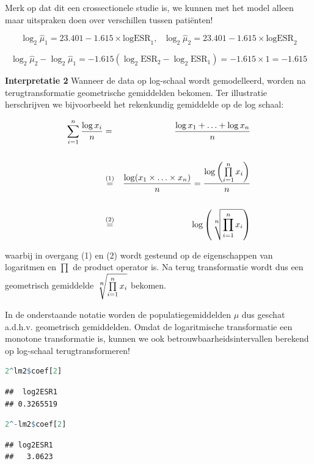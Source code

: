 \documentclass[
  12pt,dutch,coursenotes]{book}
\theoremstyle{definition}
\theoremstyle{definition}
\theoremstyle{definition}
\theoremstyle{definition}
\theoremstyle{remark}
\begin{document}
Merk op dat dit een crossectionele studie is, we kunnen met het model alleen maar uitspraken doen over verschillen tussen patiënten!

\[\log_2 \hat\mu_1=23.401  -1.615 \times \text{logESR}_1,\text{ } \log_2 \hat\mu_2=23.401  -1.615 \times \text{logESR}_2 \]

\[\log_2 \hat\mu_2-\log_2 \hat\mu_1=  -1.615 (\log_2 \text{ESR}_2-\log_2 \text{ESR}_1) = -1.615 \times 1 = -1.615\]

\textbf{Interpretatie 2}
Wanneer de data op log-schaal wordt gemodelleerd, worden na terugtransformatie geometrische gemiddelden bekomen.
Ter illustratie herschrijven we bijvoorbeeld het rekenkundig gemiddelde op de log schaal:

\begin{eqnarray*}
\sum\limits_{i=1}^n \frac{\log x_i}{n}&=&\frac{\log x_1 + \ldots + \log x_n}{n}\\\\
&\stackrel{(1)}{=}&\frac{\log(x_1 \times \ldots \times x_n)}{n}=\frac{\log\left(\prod\limits_{i=1}^n x_i\right)}{n}\\\\
&\stackrel{(2)}{=}&\log \left(\sqrt[\leftroot{-1}\uproot{2}\scriptstyle n]{\prod\limits_{i=1}^n x_i}\right)
\end{eqnarray*}

waarbij in overgang (1) en (2) wordt gesteund op de eigenschappen van logaritmen en \(\prod\) de product operator is.
Na terug transformatie wordt dus een geometrisch gemiddelde \(\sqrt[\leftroot{-1}\uproot{2}\scriptstyle n]{\prod\limits_{i=1}^n x_i}\) bekomen.

In de onderstaande notatie worden de populatiegemiddelden \(\mu\) dus geschat a.d.h.v. geometrisch gemiddelden.
Omdat de logaritmische transformatie een monotone transformatie is, kunnen we ook betrouwbaarheidsintervallen berekend op log-schaal terugtransformeren!

\begin{lstlisting}[language=R]
2^lm2$coef[2]
\end{lstlisting}

\begin{lstlisting}
##  log2ESR1 
## 0.3265519
\end{lstlisting}

\begin{lstlisting}[language=R]
2^-lm2$coef[2]
\end{lstlisting}

\begin{lstlisting}
## log2ESR1 
##   3.0623
\end{lstlisting}
\end{document}
